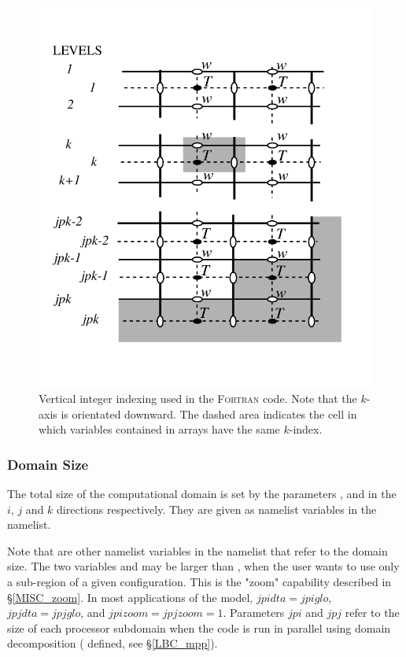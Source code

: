 \begin{figure}[!pt]    \begin{center}
\includegraphics[width=.90\textwidth]{./TexFiles/Figures/Fig_index_vert.pdf}
\caption{ \label{Fig_index_vert}     
Vertical integer indexing used in the \textsc{Fortran } code. Note that 
the $k$-axis is orientated downward. The dashed area indicates the cell in 
which variables contained in arrays have the same $k$-index.}
\end{center}   \end{figure}

\subsubsection{Domain Size}
\label{DOM_size}

The total size of the computational domain is set by the parameters , 
 and  in the $i$, $j$ and $k$ directions respectively. They are 
given as namelist variables in the  namelist. 

Note that are other namelist variables in the  namelist that refer to
 the domain size. 
The two variables  and  may be larger than , 
when the user wants to use only a sub-region of a given configuration. This is 
the "zoom" capability described in \S\ref{MISC_zoom}. In most applications of 
the model, $jpidta=jpiglo$, $jpjdta=jpjglo$, and $jpizoom=jpjzoom=1$. Parameters 
$jpi$ and $jpj$ refer to the size of each processor subdomain when the code is 
run in parallel using domain decomposition ( defined, see 
\S\ref{LBC_mpp}).


